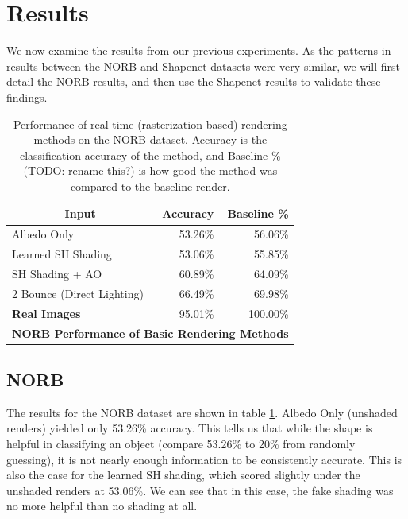 \documentclass[10pt,twocolumn,letterpaper]{article}
\newcommand{\tompson}[1]{{\color{green} JT: #1}}
\begin{document}
\section{Results}
We now examine the results from our previous experiments. As the patterns in results between the NORB and Shapenet datasets were very similar, we will first detail the NORB results, and then use the Shapenet results to validate these findings.
\begin{table}[]
\centering
\begin{tabular}{|l|r|r|}
\hline
\multicolumn{1}{|c|}{\textbf{Input}}
& \multicolumn{1}{r|}{\textbf{Accuracy}}
& \multicolumn{1}{r|}{\textbf{Baseline \%}} \\ \hline
Albedo Only 				&53.26\%	& 56.06\%	\\
Learned SH Shading			&53.06\%	& 55.85\%	\\
SH Shading + AO				&60.89\%    & 64.09\%   \\
2 Bounce (Direct Lighting)	&66.49\%	& 69.98\%   \\
\textbf{Real Images}		& 95.01\%	& 100.00\%	\\ \hline
\multicolumn{3}{|c|}{\textbf{NORB Performance of Basic Rendering Methods}}	\\ \hline
\end{tabular}

\caption{Performance of real-time (rasterization-based) rendering methods on the NORB dataset. Accuracy is the classification accuracy of the method, and Baseline \% (TODO: rename this?) is how good the method was compared to the baseline render.}
\label{table:tblnonGI}
\end{table}
\subsection{NORB}
The results for the NORB dataset are shown in table \ref{table:tblnonGI}. Albedo Only (unshaded renders) yielded only 53.26\% accuracy. This tells us that while the shape is helpful in classifying an object (compare 53.26\% to 20\% from randomly guessing), it is not nearly enough information to be consistently accurate. This is also the case for the learned SH shading, which scored slightly under the unshaded renders at 53.06\%. We can see that in this case, the fake shading was no more helpful than no shading at all.
\end{document}
